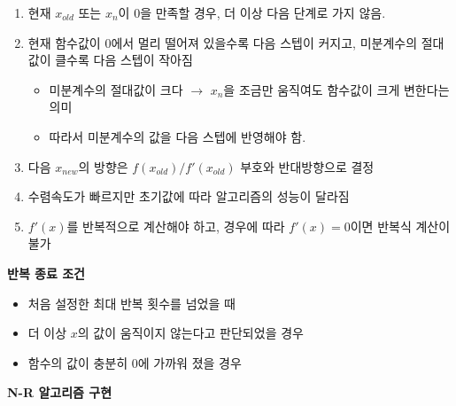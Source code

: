 \documentclass[
  11pt,
]{krantz}
\providecommand{\tightlist}{%
  \setlength{\itemsep}{0pt}\setlength{\parskip}{0pt}}
\begin{document}
\begin{enumerate}
\def\labelenumi{\arabic{enumi}.}
\tightlist
\item
  현재 \(x_{old}\) 또는 \(x_{n}\)이 0을 만족할 경우, 더 이상 다음 단계로 가지 않음.
\item
  현재 함수값이 0에서 멀리 떨어져 있을수록 다음 스텝이 커지고, 미분계수의 절대값이 클수록 다음 스텝이 작아짐

  \begin{itemize}
  \tightlist
  \item
    미분계수의 절대값이 크다 \(\rightarrow\) \(x_n\)을 조금만 움직여도 함수값이 크게 변한다는 의미
  \item
    따라서 미분계수의 값을 다음 스텝에 반영해야 함.
  \end{itemize}
\item
  다음 \(x_{new}\)의 방향은 \(f(x_{old})/f'(x_{old})\) 부호와 반대방향으로 결정
\item
  수렴속도가 빠르지만 초기값에 따라 알고리즘의 성능이 달라짐
\item
  \(f'(x)\)를 반복적으로 계산해야 하고, 경우에 따라 \(f'(x) = 0\)이면 반복식 계산이 불가
\end{enumerate}

\textbf{반복 종료 조건}

\begin{itemize}
\tightlist
\item
  처음 설정한 최대 반복 횟수를 넘었을 때
\item
  더 이상 \(x\)의 값이 움직이지 않는다고 판단되었을 경우
\item
  함수의 값이 충분히 0에 가까워 졌을 경우
\end{itemize}

\textbf{N-R 알고리즘 구현}

\footnotesize
\end{document}
